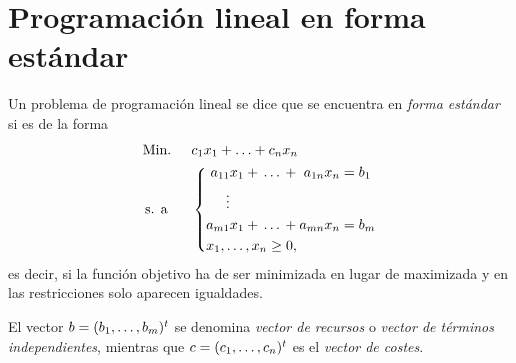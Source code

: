 \documentclass[11pt]{report}
\theoremstyle{mytheorem}
\theoremstyle{mydefinition}
\theoremstyle{myexample}
\begin{document}
\section{Programación lineal en forma estándar}

Un problema de programación lineal se dice que se encuentra en {\textit{forma estándar}} si es de la forma
\[\begin{aligned}[t]
&\text{Min. } && c_1x_1+\mathellipsis+c_nx_n \\
& \, \text{s. a} && 
\left\{ \begin{alignedat}{10}
& & a_{11}&x_1 {}+{} \mathellipsis {}+{} & a_{1n}&x_n {}={} b_1 \\
& & \vdots & & & & \\
& & a_{m1}&x_1 {}+{} \mathellipsis {}+{} & a_{mn}&x_n {}={} b_m \\
& \mathrlap{x_1,\mathellipsis,x_n \geq 0,} & & & & &
\end{alignedat}
\right.
\end{aligned}\]
es decir, si la función objetivo ha de ser minimizada en lugar de maximizada y en las restricciones solo aparecen igualdades. 



El vector $b = (b_1,\mathellipsis,b_m)^t$ se denomina {\textit{vector de recursos}} o {\textit{vector de términos independientes}}, mientras que $c = (c_1,\mathellipsis, c_n)^t$ es el {\textit{vector de costes}}.
\end{document}
